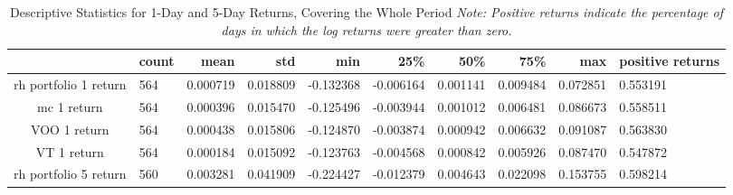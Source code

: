\begin{appendices}
\begin{table}[ht]
\centering
\caption{Descriptive Statistics for 1-Day and 5-Day Returns, Covering the Whole Period \newline \footnotesize{\textit{Note: Positive returns indicate the percentage of days in which the log returns were greater than zero.}}}
\begin{adjustbox}{width=\textwidth}
\begin{tabular}{@{}clllllllll@{}}
    \toprule
    \multicolumn{1}{r}{}     & \multicolumn{1}{r}{\textbf{count}} & \multicolumn{1}{r}{\textbf{mean}} & \multicolumn{1}{r}{\textbf{std}} & \multicolumn{1}{r}{\textbf{min}} & \multicolumn{1}{r}{\textbf{25\%}} & \multicolumn{1}{r}{\textbf{50\%}} & \multicolumn{1}{r}{\textbf{75\%}} & \multicolumn{1}{r}{\textbf{max}} & \multicolumn{1}{r}{\textbf{positive returns}} \\ \midrule
    rh portfolio 1 return & 564                                & 0.000719                          & 0.018809                         & -0.132368                        & -0.006164                         & 0.001141                          & 0.009484                          & 0.072851                         & 0.553191                                      \\
    mc 1 return            & 564                                & 0.000396                          & 0.015470                         & -0.125496                        & -0.003944                         & 0.001012                          & 0.006481                          & 0.086673                         & 0.558511                                      \\
    VOO 1 return           & 564                                & 0.000438                          & 0.015806                         & -0.124870                        & -0.003874                         & 0.000942                          & 0.006632                          & 0.091087                         & 0.563830                                      \\
    VT 1 return            & 564                                & 0.000184                          & 0.015092                         & -0.123763                        & -0.004568                         & 0.000842                          & 0.005926                          & 0.087470                         & 0.547872                                      \\
    rh portfolio 5 return & 560                                & 0.003281                          & 0.041909                         & -0.224427                        & -0.012379                         & 0.004643                          & 0.022098                          & 0.153755                         & 0.598214                                      \\

\end{tabular}
\end{adjustbox}
\end{table}
\end{appendices}
